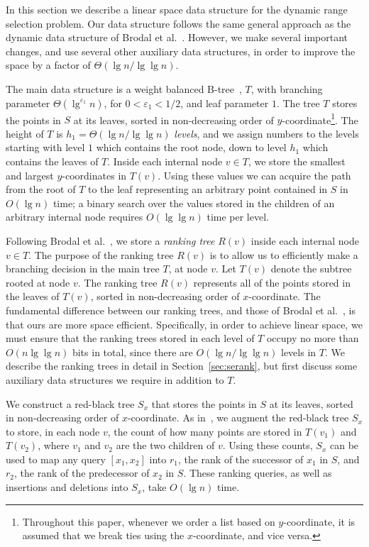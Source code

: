 \documentclass{llncs}
\begin{document}
In this section we describe a linear space data structure for the
dynamic range selection problem.  Our data structure follows the same
general approach as the dynamic data structure of Brodal et
al.~\cite{BGJS10}.  However, we make several important changes, and
use several other auxiliary data structures, in order to improve the
space by a factor of $\Theta(\lg n / \lg \lg n)$.

The main data structure is a weight balanced B-tree~\cite{AV03}, $T$,
with branching parameter $\Theta(\lg^{\varepsilon_1}n)$, for $0 <
\varepsilon_1 < 1/2$, and leaf parameter $1$.  The tree $T$ stores the
points in $S$ at its leaves, sorted in non-decreasing order of
$y$-coordinate\footnote{Throughout this paper, whenever we order a
  list based on $y$-coordinate, it is assumed that we break ties using
  the $x$-coordinate, and vice versa.}.  The height of $T$ is $h_1 =
\Theta(\lg n /\lg \lg n)$ \emph{levels}, and we assign numbers to the
levels starting with level $1$ which contains the root node, down to
level $h_1$ which contains the leaves of $T$.  Inside each internal
node $v \in T$, we store the smallest and largest $y$-coordinates in
$T(v)$.  Using these values we can acquire the path from the root of
$T$ to the leaf representing an arbitrary point contained in $S$ in
$O(\lg n)$ time; a binary search over the values stored in the
children of an arbitrary internal node requires $O(\lg \lg n)$ time
per level.


Following Brodal et al.~\cite{BGJS10}, we store a \emph{ranking tree}
$R(v)$ inside each internal node $v \in T$.  The purpose of the
ranking tree $R(v)$ is to allow us to efficiently make a branching
decision in the main tree $T$, at node $v$.  Let $T(v)$ denote the
subtree rooted at node $v$.  The ranking tree $R(v)$ represents all of
the points stored in the leaves of $T(v)$, sorted in non-decreasing
order of $x$-coordinate.  The fundamental difference between our
ranking trees, and those of Brodal et al.~\cite{BGJS10}, is that ours
are more space efficient.  Specifically, in order to achieve linear
space, we must ensure that the ranking trees stored in each level of
$T$ occupy no more than $O(n \lg \lg n)$ bits in total, since there
are $O(\lg n / \lg \lg n)$ levels in $T$.  We describe the ranking
trees in detail in Section~\ref{sec:serank}, but first discuss some
auxiliary data structures we require in addition to $T$.


We construct a red-black tree $S_x$ that stores the points in $S$ at
its leaves, sorted in non-decreasing order of $x$-coordinate.  As
in~\cite{BGJS10}, we augment the red-black tree $S_x$ to store, in
each node $v$, the count of how many points are stored in $T(v_1)$ and
$T(v_2)$, where $v_1$ and $v_2$ are the two children of $v$.  Using
these counts, $S_x$ can be used to map any query $[x_1,x_2]$ into
$r_1$, the rank of the successor of $x_1$ in $S$, and $r_2$, the rank
of the predecessor of $x_2$ in $S$.  These ranking queries, as well as
insertions and deletions into $S_x$, take $O(\lg n)$ time. 
\end{document}
